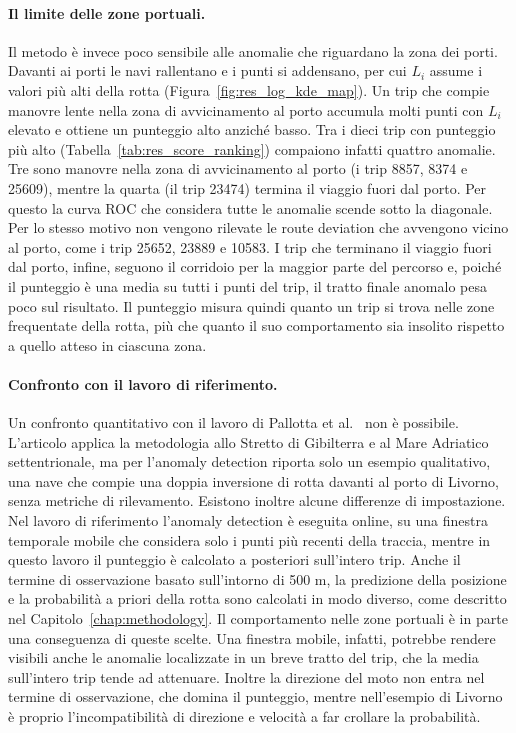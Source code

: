 \paragraph{Il limite delle zone portuali.} Il metodo è invece poco sensibile alle anomalie che
riguardano la zona dei porti. Davanti ai porti le navi rallentano e i punti si addensano, per
cui $L_i$ assume i valori più alti della rotta (Figura~\ref{fig:res_log_kde_map}). Un trip che
compie manovre lente nella zona di avvicinamento al porto accumula molti punti con $L_i$
elevato e ottiene un punteggio alto anziché basso. Tra i dieci trip con punteggio più alto (Tabella~\ref{tab:res_score_ranking}) compaiono infatti
quattro anomalie. Tre sono manovre nella zona di avvicinamento al porto (i trip 8857, 8374 e 25609),
mentre la quarta (il trip 23474) termina il viaggio fuori dal porto. Per questo la curva
ROC che considera tutte le anomalie scende sotto la diagonale. Per lo stesso motivo non vengono
rilevate le route deviation che avvengono vicino al porto, come i trip 25652, 23889 e 10583. I trip che terminano il viaggio
fuori dal porto, infine, seguono il corridoio per la maggior parte del percorso e, poiché il
punteggio è una media su tutti i punti del trip, il tratto finale anomalo pesa poco sul
risultato. Il punteggio misura quindi quanto un trip si trova nelle zone frequentate della
rotta, più che quanto il suo comportamento sia insolito rispetto a quello atteso in ciascuna
zona.

\paragraph{Confronto con il lavoro di riferimento.} Un confronto quantitativo con il lavoro di Pallotta et al.~\cite{pallotta}
non è possibile. L'articolo applica la metodologia allo Stretto di Gibilterra e al Mare
Adriatico settentrionale, ma per l'anomaly detection riporta solo un esempio qualitativo, una
nave che compie una doppia inversione di rotta davanti al porto di Livorno, senza metriche di
rilevamento. Esistono inoltre alcune differenze di impostazione. Nel lavoro di riferimento l'anomaly
detection è eseguita online, su una finestra temporale mobile che considera solo i punti più
recenti della traccia, mentre in questo lavoro il punteggio è calcolato a posteriori sull'intero
trip. Anche il termine di osservazione basato sull'intorno di 500 m, la predizione della posizione e la
probabilità a priori della rotta sono calcolati in modo diverso, come descritto nel
Capitolo~\ref{chap:methodology}. Il comportamento
nelle zone portuali è in parte una conseguenza di queste scelte. Una finestra mobile, infatti,
potrebbe rendere visibili anche le anomalie localizzate in un breve tratto del trip, che la
media sull'intero trip tende ad attenuare. Inoltre la direzione del moto non entra nel termine
di osservazione, che domina il punteggio, mentre nell'esempio di Livorno è proprio l'incompatibilità
di direzione e velocità a far crollare la probabilità.

